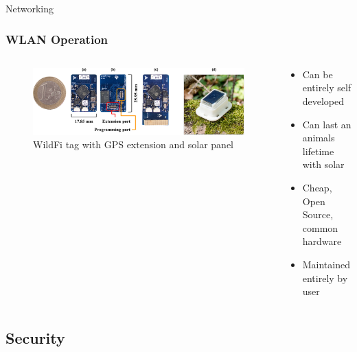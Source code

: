 \documentclass{beamer}
\begin{document}
  \begin{frame}{Networking}
    \frametitle{WLAN Operation}
    \begin{columns}
      \begin{column}{0.5\textwidth}
        \begin{figure}[htbp]
          \centering
          \includegraphics[width=\textwidth]{images/WildFi_Tag.jpg}
          \caption{WildFi tag with GPS extension and solar panel \cite{wild2023internet}}
          \label{fig:WildFi_Tag}
        \end{figure}
      \end{column}
      \begin{column}{0.5\textwidth}
        \begin{itemize}
          \item Can be entirely self developed
          \item Can last an animals lifetime with solar
          \item Cheap, Open Source, common hardware
          \item Maintained entirely by user
        \end{itemize}
      \end{column}
    \end{columns}
  \end{frame}

\subsection{Security}
\end{document}
